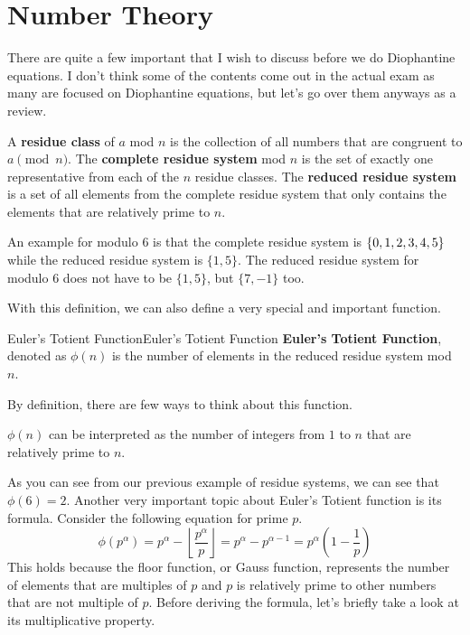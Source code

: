 \documentclass[../../../main.tex]{subfiles}
\begin{document}
\section{Number Theory}

There are quite a few important that I wish to discuss before
we do Diophantine equations. I don't think some of the contents
come out in the actual exam as many are focused on Diophantine
equations, but let's go over them anyways as a review.

\begin{definition}{}{}
A \textbf{residue class} of $a$ mod $n$ is the collection of
all numbers that are congruent to $a \pmod{n}$.
The \textbf{complete residue system} mod $n$ is the set of
exactly one representative from each of the $n$ residue classes.
The \textbf{reduced residue system} is a set of all elements
from the complete residue system that only contains the elements
that are relatively prime to $n$.
\end{definition}

An example for modulo $6$ is that the complete residue system
is $\{ 0, 1, 2, 3, \linebreak 4, 5 \}$ while the reduced residue
system is $\{ 1, 5 \}$. The reduced residue system for modulo $6$
does not have to be $\{ 1, 5 \}$, but $\{ 7, -1 \}$ too.

With this definition, we can also define a very special and
important function.

\begin{definition}{Euler's Totient Function}{Euler's Totient Function}
\textbf{Euler's Totient Function}, denoted as $\phi(n)$ is
the number of elements in the reduced residue system mod $n$.
\end{definition}

By definition, there are few ways to think about this function.

\begin{important}
$\phi(n)$ can be interpreted as the number of integers from
$1$ to $n$ that are relatively prime to $n$.
\end{important}

As you can see from our previous example of residue systems,
we can see that $\phi(6) = 2$. Another very important topic about
Euler's Totient function is its formula. Consider the following
equation for prime $p$.
\[
\phi\left( p^\alpha \right)
= p^\alpha - \left\lfloor \frac{p^\alpha}{p} \right\rfloor
= p^\alpha - p^{\alpha - 1}
= p^\alpha \left( 1 - \frac{1}{p} \right)
\]
This holds because the floor function, or Gauss function,
represents the number of elements that are multiples of $p$ and
$p$ is relatively prime to other numbers that are not multiple
of $p$. Before deriving the formula, let's briefly take a look
at its multiplicative property.
\end{document}
